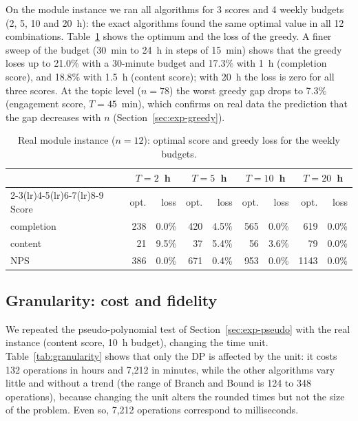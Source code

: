 On the module instance we ran all algorithms for 3 scores and 4 weekly budgets (2, 5, 10 and 20~h): the exact algorithms found the same optimal value in all 12 combinations. Table~\ref{tab:real-greedy} shows the optimum and the loss of the greedy. A finer sweep of the budget (30~min to 24~h in steps of 15~min) shows that the greedy loses up to 21.0\% with a 30-minute budget and 17.3\% with 1~h (completion score), and 18.8\% with 1.5~h (content score); with 20~h the loss is zero for all three scores. At the topic level ($n=78$) the worst greedy gap drops to 7.3\% (engagement score, $T=45$~min), which confirms on real data the prediction that the gap decreases with $n$ (Section~\ref{sec:exp-greedy}).

\begin{table}[h]
\centering
\caption{Real module instance ($n=12$): optimal score and greedy loss for the weekly budgets.}\label{tab:real-greedy}
\small
\begin{tabular}{@{}l rr rr rr rr@{}}
\toprule
 & \multicolumn{2}{c}{$T=2$~h} & \multicolumn{2}{c}{$T=5$~h} & \multicolumn{2}{c}{$T=10$~h} & \multicolumn{2}{c}{$T=20$~h}\\
\cmidrule(lr){2-3}\cmidrule(lr){4-5}\cmidrule(lr){6-7}\cmidrule(lr){8-9}
Score & opt. & loss & opt. & loss & opt. & loss & opt. & loss\\
\midrule
completion & 238 & 0.0\% & 420 & 4.5\% & 565 & 0.0\% & 619 & 0.0\%\\
content & 21 & 9.5\% & 37 & 5.4\% & 56 & 3.6\% & 79 & 0.0\%\\
NPS & 386 & 0.0\% & 671 & 0.4\% & 953 & 0.0\% & 1143 & 0.0\%\\
\bottomrule
\end{tabular}
\end{table}

\subsection{Granularity: cost and fidelity}

We repeated the pseudo-polynomial test of Section~\ref{sec:exp-pseudo} with the real instance (content score, 10~h budget), changing the time unit. Table~\ref{tab:granularity} shows that only the DP is affected by the unit: it costs 132 operations in hours and 7,212 in minutes, while the other algorithms vary little and without a trend (the range of Branch and Bound is 124 to 348 operations), because changing the unit alters the rounded times but not the size of the problem. Even so, 7,212 operations correspond to milliseconds.

